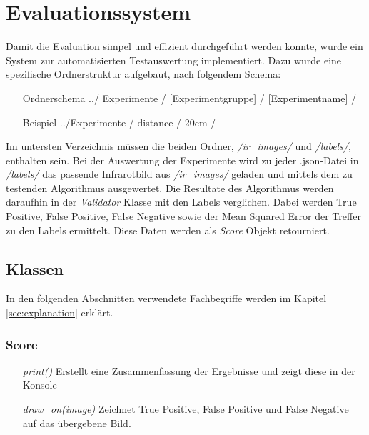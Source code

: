 \section{Evaluationssystem}

Damit die Evaluation simpel und effizient durchgeführt werden konnte, wurde ein System zur automatisierten Testauswertung implementiert. Dazu wurde eine spezifische Ordnerstruktur aufgebaut, nach folgendem Schema:

\begin{itemize}[leftmargin=4cm, align=left, labelsep=*, labelwidth=*]
	\item[Ordnerschema] ../ Experimente / [Experimentgruppe] / [Experimentname] /
	\item[Beispiel] ../Experimente / distance / 20cm / 
\end{itemize}

\noindent
Im untersten Verzeichnis müssen die beiden Ordner, \textit{/ir\_images/} und \textit{/labels/}, enthalten sein. Bei der Auswertung der Experimente wird zu jeder .json-Datei in \textit{/labels/} das passende Infrarotbild aus \textit{/ir\_images/} geladen und mittels dem zu testenden Algorithmus ausgewertet. Die Resultate des Algorithmus werden daraufhin in der \textit{Validator} Klasse mit den Labels verglichen. Dabei werden True Positive, False Positive, False Negative sowie der Mean Squared Error der Treffer zu den Labels ermittelt. Diese Daten werden als \textit{Score} Objekt retourniert.\\

\subsection{Klassen}

In den folgenden Abschnitten verwendete Fachbegriffe werden im Kapitel \ref{sec:explanation} erklärt.

\subsubsection{Score}

\begin{itemize}[leftmargin=*,labelindent=3cm, labelsep=1cm]
	\item[\textit{print()}] Erstellt eine Zusammenfassung der Ergebnisse und zeigt diese in der Konsole
	\item[\textit{draw\_on(image)}] Zeichnet True Positive, False Positive und False Negative auf das übergebene Bild.
\end{itemize}

